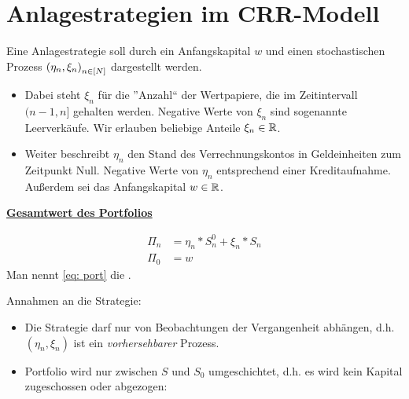 \section{Anlagestrategien im CRR-Modell}

Eine Anlagestrategie soll durch ein Anfangskapital $w$ und einen stochastischen Prozess $\left( \eta_n, \xi_n \right)_{n \in [N]}$ dargestellt werden. 
\begin{itemize}
	\item Dabei steht $\xi_n$ für die ''Anzahl`` der Wertpapiere, die im Zeitintervall $(n-1,n]$ gehalten werden. Negative Werte von $\xi_n$ sind sogenannte Leerverkäufe. Wir erlauben beliebige Anteile $\xi_n \in \mathbb{R}$.
	\item Weiter beschreibt $\eta_n$ den Stand des Verrechnungskontos in Geldeinheiten zum Zeitpunkt Null. Negative Werte von $\eta_n$ entsprechend einer Kreditaufnahme.
	Außerdem sei das Anfangskapital $w \in \mathbb{R}$.
\end{itemize}

\textbf{\underline{Gesamtwert des Portfolios}}

\begin{equation*}
\begin{aligned}
\Pi_n &= \eta_n * S_n^0 + \xi_n * S_n \\
\Pi_0 &= w
\end{aligned} \tag{Port} \label{eq: port}
\end{equation*}
Man nennt \eqref{eq: port} die .

Annahmen an die Strategie:
\begin{itemize}
	\item Die Strategie darf nur von Beobachtungen der Vergangenheit abhängen, d.h. $(\eta_n, \xi_n)$ ist ein \textit{vorhersehbarer} Prozess.
	\item Portfolio wird nur zwischen $S$ und $S_0$ umgeschichtet, d.h. es wird kein Kapital zugeschossen oder abgezogen:
%	
%	
%	
%	
%		
\end{itemize}

